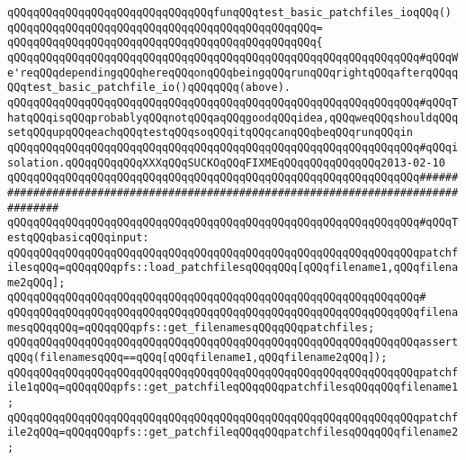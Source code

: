 \newline
\verb|qQQqqQQqqQQqqQQqqQQqqQQqqQQqqQQqfunqQQqtest_basic_patchfiles_ioqQQq()|\newline
\verb|qQQqqQQqqQQqqQQqqQQqqQQqqQQqqQQqqQQqqQQqqQQqqQQq=|\newline
\verb|qQQqqQQqqQQqqQQqqQQqqQQqqQQqqQQqqQQqqQQqqQQqqQQq{|\newline
\verb|qQQqqQQqqQQqqQQqqQQqqQQqqQQqqQQqqQQqqQQqqQQqqQQqqQQqqQQqqQQqqQQq#qQQqWe'reqQQqdependingqQQqhereqQQqonqQQqbeingqQQqrunqQQqrightqQQqafterqQQqqQQqtest_basic_patchfile_io()qQQqqQQq(above).|\newline
\verb|qQQqqQQqqQQqqQQqqQQqqQQqqQQqqQQqqQQqqQQqqQQqqQQqqQQqqQQqqQQqqQQq#qQQqThatqQQqisqQQqprobablyqQQqnotqQQqaqQQqgoodqQQqidea,qQQqweqQQqshouldqQQqsetqQQqupqQQqeachqQQqtestqQQqsoqQQqitqQQqcanqQQqbeqQQqrunqQQqin|\newline
\verb|qQQqqQQqqQQqqQQqqQQqqQQqqQQqqQQqqQQqqQQqqQQqqQQqqQQqqQQqqQQqqQQq#qQQqisolation.qQQqqQQqqQQqXXXqQQqSUCKOqQQqFIXMEqQQqqQQqqQQqqQQq2013-02-10|\newline
\newline
\newline
\verb|qQQqqQQqqQQqqQQqqQQqqQQqqQQqqQQqqQQqqQQqqQQqqQQqqQQqqQQqqQQqqQQq####################################################################################|\newline
\verb|qQQqqQQqqQQqqQQqqQQqqQQqqQQqqQQqqQQqqQQqqQQqqQQqqQQqqQQqqQQqqQQq#qQQqTestqQQqbasicqQQqinput:|\newline
\newline
\verb|qQQqqQQqqQQqqQQqqQQqqQQqqQQqqQQqqQQqqQQqqQQqqQQqqQQqqQQqqQQqqQQqpatchfilesqQQq=qQQqqQQqpfs::load_patchfilesqQQqqQQq[qQQqfilename1,qQQqfilename2qQQq];|\newline
\verb|qQQqqQQqqQQqqQQqqQQqqQQqqQQqqQQqqQQqqQQqqQQqqQQqqQQqqQQqqQQqqQQq#|\newline
\verb|qQQqqQQqqQQqqQQqqQQqqQQqqQQqqQQqqQQqqQQqqQQqqQQqqQQqqQQqqQQqqQQqfilenamesqQQqqQQq=qQQqqQQqpfs::get_filenamesqQQqqQQqpatchfiles;|\newline
\newline
\verb|qQQqqQQqqQQqqQQqqQQqqQQqqQQqqQQqqQQqqQQqqQQqqQQqqQQqqQQqqQQqqQQqassertqQQq(filenamesqQQq==qQQq[qQQqfilename1,qQQqfilename2qQQq]);|\newline
\newline
\verb|qQQqqQQqqQQqqQQqqQQqqQQqqQQqqQQqqQQqqQQqqQQqqQQqqQQqqQQqqQQqqQQqpatchfile1qQQq=qQQqqQQqpfs::get_patchfileqQQqqQQqpatchfilesqQQqqQQqfilename1;|\newline
\verb|qQQqqQQqqQQqqQQqqQQqqQQqqQQqqQQqqQQqqQQqqQQqqQQqqQQqqQQqqQQqqQQqpatchfile2qQQq=qQQqqQQqpfs::get_patchfileqQQqqQQqpatchfilesqQQqqQQqfilename2;|\newline
